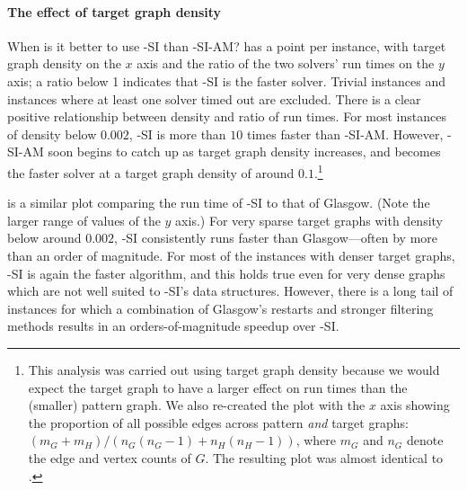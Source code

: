 
\paragraph*{The effect of target graph density}
When is it better to use \McSplit-SI than \McSplit-SI-AM?
 has a point per instance, with target graph density on the $x$ axis and the ratio of the two solvers' run times 
on the $y$ axis; a ratio below 1 indicates that \McSplit-SI is the faster solver.  Trivial instances and instances where at least one
solver timed out are excluded.  There is a clear positive relationship between density and ratio of run times.  For most instances of
density below $0.002$, \McSplit-SI is more than $10$ times faster than \McSplit-SI-AM.  However,
\McSplit-SI-AM soon begins to catch up as target graph density increases, and becomes the faster solver at a target graph density of around
$0.1$.\footnote{This analysis was carried out using target graph density because we would expect the target graph to have
a larger effect on run times than the (smaller) pattern graph.  We also re-created the plot with the $x$ axis showing the proportion
of all possible edges across pattern \emph{and} target graphs: $(m_G + m_H) / (n_G(n_G-1) + n_H(n_H-1))$,
where $m_G$ and $n_G$ denote the edge and vertex counts of $G$.  The resulting
plot was almost identical to .}

 is a similar plot comparing the run time of \McSplit-SI to that of Glasgow.
(Note the larger range of values of the $y$ axis.)  For very sparse target graphs with density below around $0.002$,
\McSplit-SI consistently runs faster than Glasgow---often by more than an order of magnitude.  For most of the
instances with denser target graphs,
\McSplit-SI is again the faster algorithm, and this holds true even for very dense graphs which are not well suited
to \McSplit-SI's data structures.  However, there is a long tail of instances
for which a combination of Glasgow's restarts and stronger filtering methods results in
an orders-of-magnitude speedup over \McSplit-SI.

